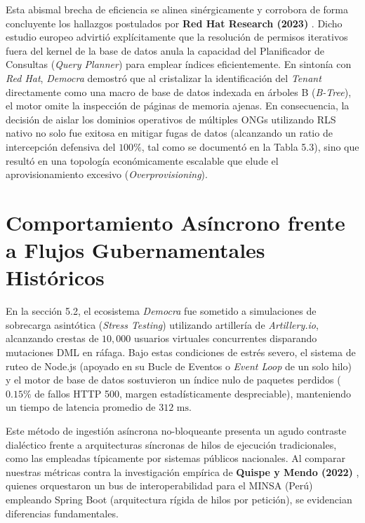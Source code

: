 Esta abismal brecha de eficiencia se alinea sin\'ergicamente y corrobora de forma concluyente los hallazgos postulados por \textbf{Red Hat Research (2023)} \citep{redhat2023}. Dicho estudio europeo advirti\'o expl\'icitamente que la resoluci\'on de permisos iterativos fuera del kernel de la base de datos anula la capacidad del Planificador de Consultas (\textit{Query Planner}) para emplear \'indices eficientemente. En sinton\'ia con \textit{Red Hat}, \textit{Democra} demostr\'o que al cristalizar la identificaci\'on del \textit{Tenant} directamente como una macro de base de datos indexada en \'arboles B (\textit{B-Tree}), el motor omite la inspecci\'on de p\'aginas de memoria ajenas. En consecuencia, la decisi\'on de aislar los dominios operativos de m\'ultiples ONGs utilizando RLS nativo no solo fue exitosa en mitigar fugas de datos (alcanzando un ratio de intercepci\'on defensiva del $100\%$, tal como se document\'o en la Tabla 5.3), sino que result\'o en una topolog\'ia econ\'omicamente escalable que elude el aprovisionamiento excesivo (\textit{Overprovisioning}).

\section{Comportamiento As\'incrono frente a Flujos Gubernamentales Hist\'oricos}

En la secci\'on 5.2, el ecosistema \textit{Democra} fue sometido a simulaciones de sobrecarga asint\'otica (\textit{Stress Testing}) utilizando artiller\'ia de \textit{Artillery.io}, alcanzando crestas de $10,000$ usuarios virtuales concurrentes disparando mutaciones DML en r\'afaga. Bajo estas condiciones de estr\'es severo, el sistema de ruteo de Node.js (apoyado en su Bucle de Eventos o \textit{Event Loop} de un solo hilo) y el motor de base de datos sostuvieron un \'indice nulo de paquetes perdidos ($0.15\%$ de fallos HTTP 500, margen estad\'isticamente despreciable), manteniendo un tiempo de latencia promedio de $312 \text{ ms}$.

Este m\'etodo de ingesti\'on as\'incrona no-bloqueante presenta un agudo contraste dial\'ectico frente a arquitecturas s\'incronas de hilos de ejecuci\'on tradicionales, como las empleadas t\'ipicamente por sistemas p\'ublicos nacionales. Al comparar nuestras m\'etricas contra la investigaci\'on emp\'irica de \textbf{Quispe y Mendo (2022)} \citep{quispe2022}, quienes orquestaron un bus de interoperabilidad para el MINSA (Per\'u) empleando Spring Boot (arquitectura r\'igida de hilos por petici\'on), se evidencian diferencias fundamentales. 

